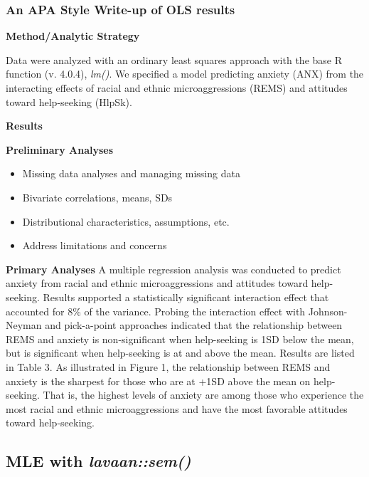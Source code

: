 \documentclass[
  11pt,
]{book}
\providecommand{\tightlist}{%
  \setlength{\itemsep}{0pt}\setlength{\parskip}{0pt}}
\begin{document}
\hypertarget{an-apa-style-write-up-of-ols-results}{%
\subsubsection{An APA Style Write-up of OLS results}\label{an-apa-style-write-up-of-ols-results}}

\textbf{Method/Analytic Strategy}

Data were analyzed with an ordinary least squares approach with the base R function (v. 4.0.4), \emph{lm()}. We specified a model predicting anxiety (ANX) from the interacting effects of racial and ethnic microaggressions (REMS) and attitudes toward help-seeking (HlpSk).

\textbf{Results}

\textbf{Preliminary Analyses}

\begin{itemize}
\tightlist
\item
  Missing data analyses and managing missing data
\item
  Bivariate correlations, means, SDs
\item
  Distributional characteristics, assumptions, etc.
\item
  Address limitations and concerns
\end{itemize}

\textbf{Primary Analyses}
A multiple regression analysis was conducted to predict anxiety from racial and ethnic microaggressions and attitudes toward help-seeking. Results supported a statistically significant interaction effect that accounted for 8\% of the variance. Probing the interaction effect with Johnson-Neyman and pick-a-point approaches indicated that the relationship between REMS and anxiety is non-significant when help-seeking is 1SD below the mean, but is significant when help-seeking is at and above the mean. Results are listed in Table 3. As illustrated in Figure 1, the relationship between REMS and anxiety is the sharpest for those who are at +1SD above the mean on help-seeking. That is, the highest levels of anxiety are among those who experience the most racial and ethnic microaggressions and have the most favorable attitudes toward help-seeking.

\hypertarget{mle-with-lavaansem}{%
\subsection{\texorpdfstring{MLE with \emph{lavaan::sem()}}{MLE with lavaan::sem()}}\label{mle-with-lavaansem}}
\end{document}
